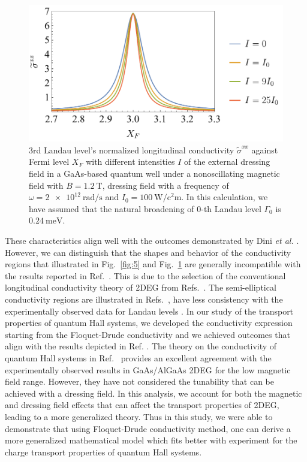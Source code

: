 \documentclass[
 reprint,
 amsmath,amssymb,
 aps,
 prb,
]{revtex4-2}
\begin{document}
\begin{figure}[t]
\includegraphics[scale=0.54]{fig_5_conductivity_with_fermi_level_zoomed}
\caption{$3$rd Landau level’s normalized longitudinal conductivity $\widetilde{\sigma}^{xx}$ against Fermi level $X_F$ with different intensities $I$ of the external dressing field in a GaAs-based quantum well under a nonoscillating magnetic field with $B = \SI{1.2}{\tesla}$, dressing field with a frequency of $\omega =\SI{2e12}{\radian\per\second}$ and $I_0 =\SI{100}{\watt\per\square\centi\metre}$.
In this calculation, we have assumed that the natural  broadening of $0$-th Landau level $\Gamma_0$ is $\SI{0.24}{\milli\eV}$.}
\label{fig:6}
\end{figure}

These characteristics align well with the outcomes demonstrated by Dini \textit{et al.} \cite{dini16}.
However, we can distinguish that the shapes and behavior of the conductivity regions that illustrated in Fig.~\ref{fig:5} and Fig.~\ref{fig:6} are generally incompatible with the results reported in Ref.~\cite{dini16}. This is due to the selection of the conventional longitudinal conductivity theory of 2DEG from Refs.~\cite{ando74_1,ando82}. The semi-elliptical conductivity regions are  illustrated in Refs.~\cite{dini16,ando74_1,ando82}, have less consistency with the experimentally observed data for Landau levels \cite{endo09}.
In our study of the transport properties of quantum Hall systems, we developed the conductivity expression starting from the Floquet-Drude conductivity \cite{wackerl20} and we achieved outcomes that align with the results depicted in Ref. \cite{endo09}.
The theory on the conductivity of quantum Hall systems in Ref.~\cite{endo09} provides an excellent agreement with the experimentally observed results in GaAs/AlGaAs 2DEG for the low magnetic field range.
However, they have not considered the tunability that can be achieved with a dressing field. In this analysis, we account for both the magnetic and dressing field effects that can affect the transport properties of 2DEG, leading to a more generalized theory. Thus in this study, we were able to demonstrate that using Floquet-Drude conductivity method, one can derive a more generalized mathematical model which fits better with experiment for the charge transport properties of quantum Hall systems.
\end{document}
